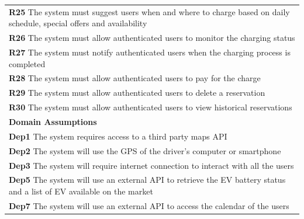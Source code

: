 \begin{table}[H]
\begin{tabularx}{\textwidth}{X}
        \textbf{R25} The system must suggest users when and where to charge based on daily schedule, special offers and availability                                                 \\
        \textbf{R26} The system must allow authenticated users to monitor the charging status                                                                                        \\
        \textbf{R27} The system must notify authenticated users when the charging process is completed                                                                               \\
        \textbf{R28} The system must allow authenticated users to pay for the charge                                                                                                 \\
        \textbf{R29} The system must allow authenticated users to delete a reservation                                                                                               \\
        \textbf{R30} The system must allow authenticated users to view historical reservations                                                                                       \\ \midrule
        \textbf{Domain Assumptions}                                                                                                                                                  \\ \midrule
        \textbf{Dep1}  The system requires access to a third party maps API                                                                                                          \\
        \textbf{Dep2}  The system will use the GPS of the driver's computer or smartphone                                                                                            \\
        \textbf{Dep3}  The system will require internet connection to interact with all the users                                                                                    \\
        \textbf{Dep5}  The system will use an external API to retrieve the EV battery status and a list of EV available on the market                                                \\
        \textbf{Dep7}  The system will use an external API to access the calendar of the users                                                                                       \\

\end{tabularx}
\end{table}
